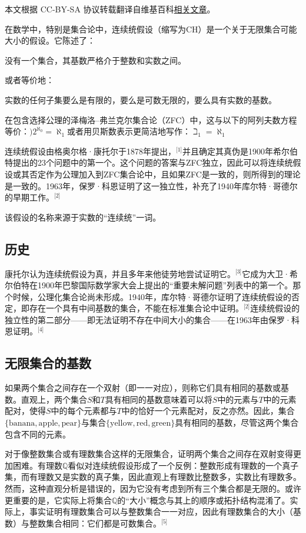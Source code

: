 
本文根据 CC-BY-SA 协议转载翻译自维基百科\href{https://en.wikipedia.org/wiki/Continuum_hypothesis}{相关文章}。

在数学中，特别是集合论中，连续统假设（缩写为CH）是一个关于无限集合可能大小的假设。它陈述了：

没有一个集合，其基数严格介于整数和实数之间。

或者等价地：

实数的任何子集要么是有限的，要么是可数无限的，要么具有实数的基数。

在包含选择公理的泽梅洛–弗兰克尔集合论（ZFC）中，这与以下的阿列夫数方程等价：\()
2^{\aleph_0} = \aleph_1\)或者用贝斯数表示更简洁地写作：\(\beth_1 = \aleph_1\)

连续统假设由格奥尔格·康托尔于1878年提出，\(^\text{[1]}\)并且确定其真伪是1900年希尔伯特提出的23个问题中的第一个。这个问题的答案与ZFC独立，因此可以将连续统假设或其否定作为公理加入到ZFC集合论中，且如果ZFC是一致的，则所得到的理论是一致的。1963年，保罗·科恩证明了这一独立性，补充了1940年库尔特·哥德尔的早期工作。\(^\text{[2]}\)

该假设的名称来源于实数的“连续统”一词。
\subsection{历史} 
康托尔认为连续统假设为真，并且多年来他徒劳地尝试证明它。\(^\text{[3]}\)它成为大卫·希尔伯特在1900年巴黎国际数学家大会上提出的“重要未解问题”列表中的第一个。那个时候，公理化集合论尚未形成。1940年，库尔特·哥德尔证明了连续统假设的否定，即存在一个具有中间基数的集合，不能在标准集合论中证明。\(^\text{[2]}\)连续统假设的独立性的第二部分——即无法证明不存在中间大小的集合——在1963年由保罗·科恩证明。\(^\text{[4]}\)
\subsection{无限集合的基数} 
如果两个集合之间存在一个双射（即一一对应），则称它们具有相同的基数或基数。直观上，两个集合\( S \)和\( T \)具有相同的基数意味着可以将\( S \)中的元素与\( T \)中的元素配对，使得\( S \)中的每个元素都与\( T \)中的恰好一个元素配对，反之亦然。因此，集合\( \{\text{banana}, \text{apple}, \text{pear}\} \)与集合\( \{\text{yellow}, \text{red}, \text{green}\} \)具有相同的基数，尽管这两个集合包含不同的元素。

对于像整数集合或有理数集合这样的无限集合，证明两个集合之间存在双射变得更加困难。有理数\( \mathbb{Q} \)看似对连续统假设形成了一个反例：整数形成有理数的一个真子集，而有理数又是实数的真子集，因此直观上有理数比整数多，实数比有理数多。然而，这种直观分析是错误的，因为它没有考虑到所有三个集合都是无限的。或许更重要的是，它实际上将集合\( \mathbb{Q} \)的“大小”概念与其上的顺序或拓扑结构混淆了。实际上，事实证明有理数集合可以与整数集合一一对应，因此有理数集合的大小（基数）与整数集合相同：它们都是可数集合。\(^\text{[5]}\)

